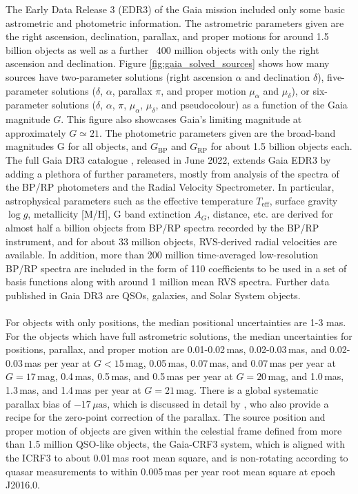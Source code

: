 \documentclass[a4paper,11pt]{article}
\begin{document}
The Early Data Release 3 (EDR3) of the Gaia mission \citep{gaiaedr3} included only some basic astrometric and photometric information. The astrometric parameters given are the right ascension, declination, parallax, and proper motions for around 1.5 billion objects as well as a further ~400 million objects with only the right ascension and declination. Figure \ref{fig:gaia_solved_sources} shows how many sources have two-parameter solutions (right ascension $\alpha$ and declination $\delta$), five-parameter solutions ($\delta$, $\alpha$, parallax $\pi$, and proper motion $\mu_\alpha$ and $\mu_\delta$), or six-parameter solutions ($\delta$, $\alpha$, $\pi$, $\mu_\alpha$, $\mu_\delta$, and pseudocolour) as a function of the Gaia magnitude $G$. This figure also showcases Gaia's limiting magnitude at approximately $G\simeq21$. The photometric parameters given are the broad-band magnitudes G for all objects, and $G_\mathrm{BP}$ and $G_\mathrm{RP}$ for about 1.5 billion objects each. The full Gaia DR3 catalogue \citep{gaiadr3}, released in June 2022, extends Gaia EDR3 by adding a plethora of further parameters, mostly from analysis of the spectra of the BP/RP photometers and the Radial Velocity Spectrometer. In particular, astrophysical parameters such as the effective temperature $T_\mathrm{eff}$, surface gravity $\log{g}$, metallicity [M/H], G band extinction $A_G$, distance, etc. are derived for almost half a billion objects from BP/RP spectra recorded by the BP/RP instrument, and for about 33 million objects, RVS-derived radial velocities are available. In addition, more than 200 million time-averaged low-resolution BP/RP spectra are included in the form of 110 coefficients to be used in a set of basis functions along with around 1 million mean RVS spectra. Further data published in Gaia DR3 are QSOs, galaxies, and Solar System objects.\\ \\
%
For objects with only positions, the median positional uncertainties are 1-3 mas. For the objects which have full astrometric solutions, the median uncertainties for positions, parallax, and proper motion are 0.01-0.02\,mas, 0.02-0.03\,mas, and 0.02-0.03\,mas per year at $G<15$\,mag, 0.05\,mas, 0.07\,mas, and 0.07\,mas per year at $G=17$\,mag, 0.4\,mas, 0.5\,mas, and 0.5\,mas per year at $G=20$\,mag, and 1.0\,mas, 1.3\,mas, and 1.4\,mas per year at $G=21$\,mag. There is a global systematic parallax bias of $-17\,\mu\mathrm{as}$, which is discussed in detail by \citet{lindegren21b}, who also provide a recipe for the zero-point correction of the parallax. The source position and proper motion of objects are given within the celestial frame defined from more than 1.5 million QSO-like objects, the Gaia-CRF3 system, which is aligned with the ICRF3 to about 0.01\,mas root mean square, and is non-rotating according to quasar measurements to within 0.005\,mas per year root mean square at epoch J2016.0.\\ \\
\end{document}
